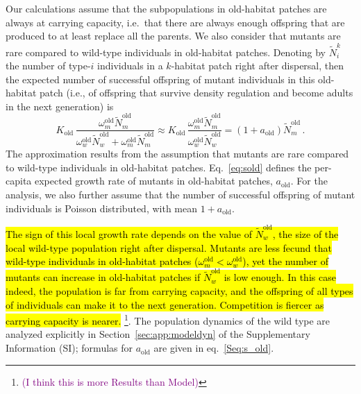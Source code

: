 \documentclass[11pt]{article}
\newcommand{\florence}[1]{\textcolor{purple}{(#1)}} %
\begin{document}
Our calculations assume that the subpopulations in old-habitat patches are always at carrying capacity, i.e.\ that there are always enough offspring that are produced to at least replace all the parents. We also consider that mutants are rare compared to wild-type individuals in old-habitat patches. Denoting by $\widetilde{N}_{i}^{k}$ the number of type-$i$ individuals in a $k$-habitat patch right after dispersal, then the expected number of successful offspring of mutant individuals in this old-habitat patch (i.e., of offspring that survive density regulation and become adults in the next generation) is 
%
\begin{equation}\label{eq:sold}
K_{\text{old}}\, \frac{\omega^\text{old}_m \widetilde{N}^{\text{old}}_m}{\omega^\text{old}_w \widetilde{N}^{\text{old}}_w + \omega^\text{old}_m \widetilde{N}^{\text{old}}_m}
%
\approx K_{\text{old}}\, \frac{\omega^\text{old}_m \widetilde{N}^{\text{old}}_m}{\omega^\text{old}_w \widetilde{N}^{\text{old}}_w} 
%
= \left(1 + a_{\text{old}}\right) \widetilde{N}^{\text{old}}_m \, .
\end{equation}
%
The approximation results from the assumption that mutants are rare compared to wild-type individuals in old-habitat patches. Eq.~\eqref{eq:sold} defines the per-capita expected growth rate of mutants in old-habitat patches, $a_{\text{old}}$. For the analysis, we also further assume that the number of successful offspring of mutant individuals is Poisson distributed, with mean $1+ a_{\text{old}}$. 

\hl{The sign of this local growth rate depends on the value of $\widetilde{N}^{\text{old}}_w$, the size of the local wild-type population right after dispersal. Mutants are less fecund that wild-type individuals in old-habitat patches ($\omega^\text{old}_m < \omega^\text{old}_w$), yet the number of mutants can increase in old-habitat patches if $\widetilde{N}^{\text{old}}_w$ is low enough. In this case indeed, the population is far from carrying capacity, and the offspring of all types of individuals can make it to the next generation. Competition is fiercer as carrying capacity is nearer. }\footnote{\florence{I think this is more Results than Model}}. The population dynamics of the wild type are analyzed explicitly in Section~\ref{sec:app:modeldyn} of the Supplementary Information (SI); formulas for $a_{\text{old}}$ are given in eq.~\ref{Seq:s_old}.
\end{document}
